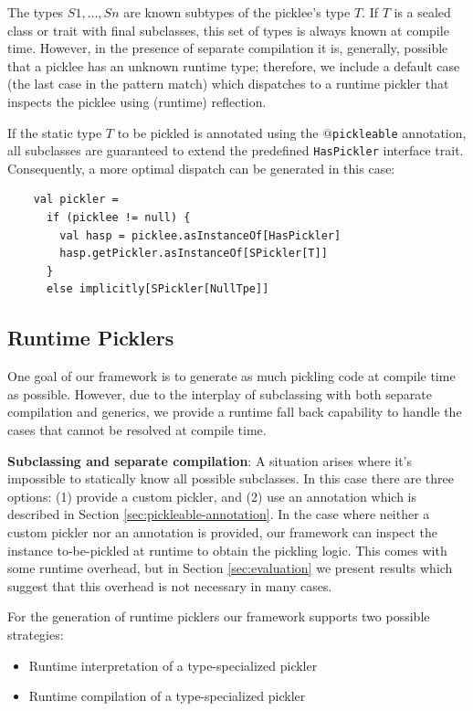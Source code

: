 \documentclass[preprint,10pt]{sigplanconf}
\theoremstyle{definition}
\theoremstyle{definition}
\newcommand{\term}[1]{\mbox{\texttt{#1}}}
\begin{document}
The types $S1, \dots, Sn$ are known subtypes of the picklee's type $T$. If $T$
is a sealed class or trait with final subclasses, this set of types is always
known at compile time. However, in the presence of separate compilation it is,
generally, possible that a picklee has an unknown runtime type; therefore, we
include a default case (the last case in the pattern match) which dispatches
to a runtime pickler that inspects the picklee using (runtime) reflection.

If the static type $T$ to be pickled is annotated using the
\term{$@$pickleable} annotation, all subclasses are guaranteed to extend the
predefined \verb|HasPickler| interface trait. Consequently, a more optimal
dispatch can be generated in this case:

\begin{lstlisting}
    val pickler =
      if (picklee != null) {
        val hasp = picklee.asInstanceOf[HasPickler]
        hasp.getPickler.asInstanceOf[SPickler[T]]
      }
      else implicitly[SPickler[NullTpe]]
\end{lstlisting}

\subsection{Runtime Picklers}
\label{sec:runtime-pickler}

One goal of our framework is to generate as much pickling code at compile time
as possible. However, due to the interplay of subclassing with both separate
compilation and generics, we provide a runtime fall back capability to handle
the cases that cannot be resolved at compile time.

{\bf Subclassing and separate compilation}: A situation arises where it's
impossible to statically know all possible subclasses. In this case there are
three options: (1) provide a custom pickler, and (2) use an annotation which
is described in Section \ref{sec:pickleable-annotation}. In the case where
neither a custom pickler nor an annotation is provided, our framework can
inspect the instance to-be-pickled at runtime to obtain the pickling logic.
This comes with some runtime overhead, but in Section \ref{sec:evaluation} we
present results which suggest that this overhead is not necessary in many
cases.

For the generation of runtime picklers our framework supports two possible
strategies:

\begin{itemize}
\item Runtime interpretation of a type-specialized pickler
\item Runtime compilation of a type-specialized pickler
\end{itemize}
\end{document}
